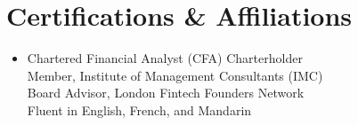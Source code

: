 \documentclass[10pt,letterpaper]{article}
\newenvironment{entrylist}{\begin{itemize}[leftmargin=0in, label={}]}{\end{itemize}}
\begin{document}
\section{Certifications \& Affiliations}
\begin{entrylist}
    \item \vspace{2pt}
    Chartered Financial Analyst (CFA) Charterholder \\
    Member, Institute of Management Consultants (IMC) \\
    Board Advisor, London Fintech Founders Network \\
    Fluent in English, French, and Mandarin
\end{entrylist}
\end{document}
